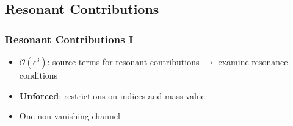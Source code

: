 \documentclass[mathserif,10pt]{beamer}
\newcommand{\bi}{\begin{itemize}}
\newcommand{\ei}{\end{itemize}}
\newcommand{\its}{\item}
\newcommand{\mc}{\mathcal}
\begin{document}
{%

\subsection{Resonant Contributions}
\frame
{
  \frametitle{Resonant Contributions I}
  \bi
  \its $\mc O(\epsilon^3)$: source terms for resonant contributions $\to$ examine resonance conditions 
  \its<2->{{\bf Unforced}: restrictions on indices and mass value }
  \its<4->{One \alert{non-vanishing} channel}
  \ei
  
  \begin{overlayarea}{\textwidth}{0.5\textheight}
  \end{overlayarea}
}

}
\end{document}
